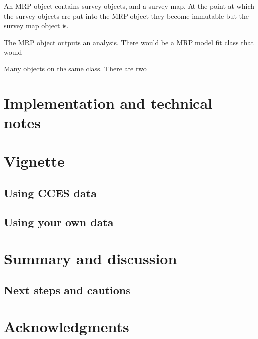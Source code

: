 \documentclass[
]{jss}
\begin{document}
An MRP object contains survey objects, and a survey map. At the point at
which the survey objects are put into the MRP object they become
immutable but the survey map object is.

The MRP object outputs an analysis. There would be a MRP model fit class
that would

Many objects on the same class. There are two

\section{Implementation and technical notes} \label{sec:implementation}

\section{Vignette} \label{sec:vignette}

\subsection*{Using CCES data}

\subsection*{Using your own data}

\section{Summary and discussion} \label{sec:summary}

\subsection*{Next steps and cautions}

\section*{Acknowledgments}
\end{document}
